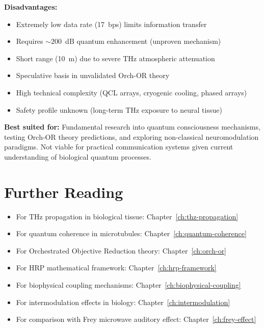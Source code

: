\textbf{Disadvantages:}
\begin{itemize}
\item Extremely low data rate (17~bps) limits information transfer
\item Requires $\sim 200$~dB quantum enhancement (unproven mechanism)
\item Short range (10~m) due to severe THz atmospheric attenuation
\item Speculative basis in unvalidated Orch-OR theory
\item High technical complexity (QCL arrays, cryogenic cooling, phased arrays)
\item Safety profile unknown (long-term THz exposure to neural tissue)
\end{itemize}

\textbf{Best suited for:} Fundamental research into quantum consciousness mechanisms, testing Orch-OR theory predictions, and exploring non-classical neuromodulation paradigms. Not viable for practical communication systems given current understanding of biological quantum processes.

\section{Further Reading}

\begin{itemize}
\item For THz propagation in biological tissue: Chapter~\ref{ch:thz-propagation}
\item For quantum coherence in microtubules: Chapter~\ref{ch:quantum-coherence}
\item For Orchestrated Objective Reduction theory: Chapter~\ref{ch:orch-or}
\item For HRP mathematical framework: Chapter~\ref{ch:hrp-framework}
\item For biophysical coupling mechanisms: Chapter~\ref{ch:biophysical-coupling}
\item For intermodulation effects in biology: Chapter~\ref{ch:intermodulation}
\item For comparison with Frey microwave auditory effect: Chapter~\ref{ch:frey-effect}
\end{itemize}
